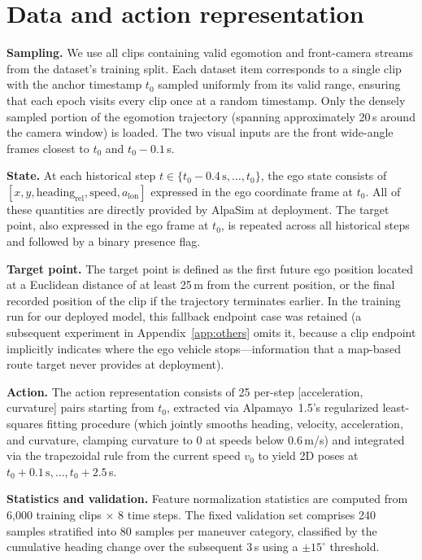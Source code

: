 \FloatBarrier
\section{Data and action representation}
\label{app:data}
\textbf{Sampling.} We use all clips containing valid egomotion and front-camera streams from the dataset's training split. Each dataset item corresponds to a single clip with the anchor timestamp $t_0$ sampled uniformly from its valid range, ensuring that each epoch visits every clip once at a random timestamp. Only the densely sampled portion of the egomotion trajectory (spanning approximately 20\,s around the camera window) is loaded. The two visual inputs are the front wide-angle frames closest to $t_0$ and $t_0-0.1$\,s.

\textbf{State.} At each historical step $t \in \{t_0-0.4\,\mathrm{s},\dots,t_0\}$, the ego state consists of $[x, y, \mathrm{heading}_\mathrm{rel}, \mathrm{speed}, a_\mathrm{lon}]$ expressed in the ego coordinate frame at $t_0$. All of these quantities are directly provided by AlpaSim at deployment. The target point, also expressed in the ego frame at $t_0$, is repeated across all historical steps and followed by a binary presence flag.

\textbf{Target point.} The target point is defined as the first future ego position located at a Euclidean distance of at least 25\,m from the current position, or the final recorded position of the clip if the trajectory terminates earlier. In the training run for our deployed model, this fallback endpoint case was retained (a subsequent experiment in Appendix~\ref{app:others} omits it, because a clip endpoint implicitly indicates where the ego vehicle stops---information that a map-based route target never provides at deployment).

\textbf{Action.} The action representation consists of 25 per-step [acceleration, curvature] pairs starting from $t_0$, extracted via Alpamayo~1.5's regularized least-squares fitting procedure (which jointly smooths heading, velocity, acceleration, and curvature, clamping curvature to 0 at speeds below 0.6\,m/s) and integrated via the trapezoidal rule from the current speed $v_0$ to yield 2D poses at $t_0+0.1\,\mathrm{s},\dots,t_0+2.5$\,s.

\textbf{Statistics and validation.} Feature normalization statistics are computed from 6{,}000 training clips $\times$ 8 time steps. The fixed validation set comprises 240 samples stratified into 80 samples per maneuver category, classified by the cumulative heading change over the subsequent 3\,s using a $\pm15^\circ$ threshold.


